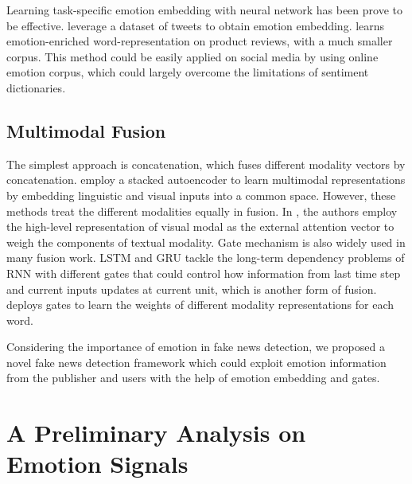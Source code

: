 \documentclass{article}
\begin{document}
	Learning task-specific emotion embedding with neural network has been prove to be effective. \cite{Tang14} leverage a dataset of tweets to obtain emotion embedding. \cite{agrawal2018learning} learns emotion-enriched word-representation on product reviews, with a much smaller corpus. This method could be easily applied on social media by using online emotion corpus, which could largely overcome the limitations of sentiment dictionaries.
	
	\subsection{Multimodal Fusion}
	The simplest approach is concatenation, which fuses different modality vectors by concatenation. \cite{silberer2017visually} employ a stacked autoencoder to learn multimodal representations by embedding linguistic and visual inputs into a common space. However, these methods treat the different modalities equally in fusion. In \cite{jin2017multimodal}, the authors employ the high-level representation of visual modal as the external attention vector to weigh the components of textual modality. Gate mechanism is also widely used in many fusion work. LSTM \cite{hochreiter1997long} and GRU \cite{bahdanau2014neural} tackle the long-term dependency problems of RNN with different gates that could control how information from last time step and current inputs updates at current unit, which is another form of fusion. \cite{wang2018learning} deploys gates to learn the weights of different modality representations for each word. 
	
	Considering the importance of emotion in fake news detection, we proposed a novel fake news detection framework which could exploit emotion information from the publisher and users with the help of emotion embedding and gates.
	
	\section{A Preliminary Analysis on Emotion Signals }
	
	
\end{document}
